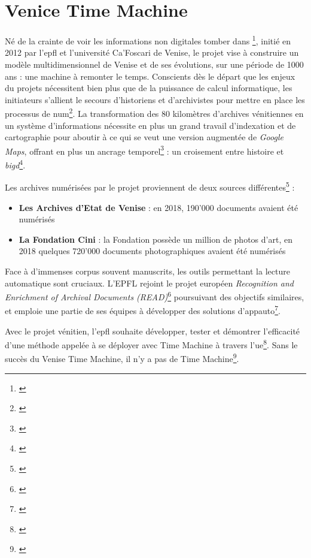 \section{Venice Time Machine}
Né de la crainte de voir les informations non digitales tomber dans \footnote{\cite{dubuc_venice_2017}}, initié en 2012 par l'\gls{epfl} et l'université Ca'Foscari de Venise, le projet vise à construire un modèle multidimensionnel de Venise et de ses évolutions, sur une période de 1000 ans : une machine à remonter le temps. Conscients dès le départ que les enjeux du projets nécessitent bien plus que de la puissance de calcul informatique, les initiateurs s'allient le secours d'historiens et d'archivistes pour mettre en place les processus de \gls{num}\footnote{\cite{abbott_time_2017}}. La transformation des 80 kilomètres d'archives vénitiennes en un système d'informations nécessite en plus un grand travail d'indexation et de cartographie pour aboutir à ce qui se veut une version augmentée de \textit{Google Maps}, offrant en plus un ancrage temporel\footnote{\cite{world.minds_frederic_nodate}} : un croisement entre histoire et \textit{\gls{bigd}}\footnote{\cite{rts_remonter_nodate}}. 

Les archives numérisées par le projet proviennent de deux sources différentes\footnote{\cite{evangelista_time_2018}} : 
\begin{itemize}
\item \textbf{Les Archives d'Etat de Venise} : en 2018, 190'000 documents avaient été numérisés
\item \textbf{La Fondation Cini} : la Fondation possède un million de photos d'art, en 2018 quelques 720'000 documents photographiques avaient été numérisés
\end{itemize}
Face à d'immenses corpus souvent manuscrits, les outils permettant la lecture automatique sont cruciaux. L'EPFL rejoint le projet européen \textit{Recognition and Enrichment of Archival Documents (READ)}\footnote{\cite{noauthor_recognition_nodate}} poursuivant des objectifs similaires, et emploie une partie de ses équipes à développer des solutions d'\gls{appauto}\footnote{\cite{nature_video_virtual_nodate}}. 

Avec le projet vénitien, l'\gls{epfl} souhaite développer, tester et démontrer l'efficacité d'une méthode appelée à se déployer avec Time Machine à travers l'\gls{ue}\footnote{\cite{arte_venice_nodate}}. Sans le succès du Venise Time Machine, il n'y a pas de Time Machine\footnote{\cite{kaplan_cartographie_2018}}. 

